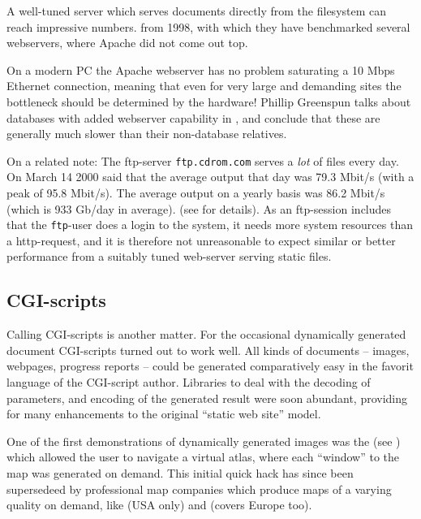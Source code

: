 

A well-tuned server which serves documents directly from the
filesystem can reach impressive numbers.
 from 1998, with which they have
benchmarked several webservers, where Apache did not come out top.


On a modern PC the Apache webserver has no problem saturating a 10
Mbps Ethernet connection, meaning that even for very large and
demanding sites the bottleneck should be determined by the hardware!
Phillip Greenspun talks about databases with added webserver
capability in \cite{phillipandalexsguidetowebpublishing}, and conclude
that these are generally much slower than their non-database
relatives.

On a related note: The ftp-server \texttt{ftp.cdrom.com} serves a
\textit{lot} of files every day.  On March 14 2000
 said that the average output that day was 79.3 Mbit/s
(with a peak of 95.8 Mbit/s).  The average output on a yearly basis
was 86.2 Mbit/s (which is 933 Gb/day in average).
(see  for details).  As
an ftp-session includes that the \texttt{ftp}-user does a login to the
system, it needs more system resources than a http-request, and it is
therefore not unreasonable to expect similar or better performance
from a suitably tuned web-server serving static files.


\subsection{CGI-scripts}
\label{sec:cgi-scripts}



Calling CGI-scripts is another matter.  For the occasional dynamically
generated document CGI-scripts turned out to work well.  All kinds of
documents -- images, webpages, progress reports -- could be generated
comparatively easy in the favorit language of the CGI-script author.
Libraries to deal with the decoding of parameters, and encoding of the
generated result were soon abundant, providing for many enhancements
to the original ``static web site'' model.

\label{sec:map-generation-first-web-application} One of the first
demonstrations of dynamically generated images was the
 (see
) which allowed the user to navigate a
virtual atlas, where each ``window'' to the map was generated on
demand.  This initial quick hack has since been supersedeed by
professional map companies which produce maps of a varying quality on
demand, like  (USA
only) and  (covers Europe
too).


